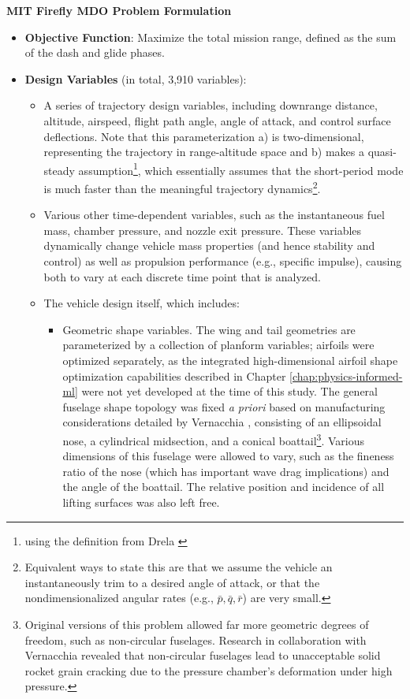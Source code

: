 \begin{example}
    \textbf{MIT Firefly MDO Problem Formulation}

    \begin{itemize}
        \item \textbf{Objective Function}: Maximize the total mission range, defined as the sum of the dash and glide phases.

        \item \textbf{Design Variables} (in total, 3,910 variables):
        \begin{itemize}
            \item A series of trajectory design variables, including downrange distance, altitude, airspeed, flight path angle, angle of attack, and control surface deflections. Note that this parameterization a) is two-dimensional, representing the trajectory in range-altitude space and b) makes a quasi-steady assumption\footnote{using the definition from Drela \cite{drela_flight_2013}}, which essentially assumes that the short-period mode is much faster than the meaningful trajectory dynamics\footnote{Equivalent ways to state this are that we assume the vehicle an instantaneously trim to a desired angle of attack, or that the nondimensionalized angular rates (e.g., $\bar{p}, \bar{q}, \bar{r}$) are very small.}.

            \item Various other time-dependent variables, such as the instantaneous fuel mass, chamber pressure, and nozzle exit pressure. These variables dynamically change vehicle mass properties (and hence stability and control) as well as propulsion performance (e.g., specific impulse), causing both to vary at each discrete time point that is analyzed.

            \item The vehicle design itself, which includes:
            \begin{itemize}
                \item Geometric shape variables. The wing and tail geometries are parameterized by a collection of planform variables; airfoils were optimized separately, as the integrated high-dimensional airfoil shape optimization capabilities described in Chapter \ref{chap:physics-informed-ml} were not yet developed at the time of this study. The general fuselage shape topology was fixed \emph{a priori} based on manufacturing considerations detailed by Vernacchia \cite{vernacchia_development_2020}, consisting of an ellipsoidal nose, a cylindrical midsection, and a conical boattail\footnote{Original versions of this problem allowed far more geometric degrees of freedom, such as non-circular fuselages. Research in collaboration with Vernacchia \cite{vernacchia_development_2020} revealed that non-circular fuselages lead to unacceptable solid rocket grain cracking due to the pressure chamber's deformation under high pressure.}. Various dimensions of this fuselage were allowed to vary, such as the fineness ratio of the nose (which has important wave drag implications) and the angle of the boattail. The relative position and incidence of all lifting surfaces was also left free.


\end{itemize}
\end{itemize}
\end{itemize}
\end{example}
